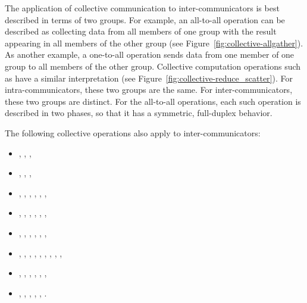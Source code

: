 
The application of collective communication to
inter-communicators is best described in terms of two groups.
For example, an all-to-all
 operation can be described as collecting data
from all members of one group with the result appearing in all members
of the other group (see Figure~\ref{fig:collective-allgather}).  As another
example, a one-to-all  operation sends data from one
member of one group to all members of the other group.
Collective computation operations such as  have
a
similar interpretation (see Figure~\ref{fig:collective-reduce_scatter}).
For intra-communicators, these two groups
are the same.  For inter-communicators, these two groups are distinct.
For the all-to-all operations, each such operation is described in two phases,
so that it
has a symmetric, full-duplex behavior.

The following collective operations also apply to inter-communicators:
\begin{itemize}
\item {}, , ,
\item {}, , ,
\item {}, , ,
      , , ,
\item {}, , ,
      , , ,
\item {}, , ,
      , , ,
\item {}, , ,
      , , ,
      , , ,
\item {}, , ,
      , , ,
\item {}, ,
, ,
, .
\end{itemize}

